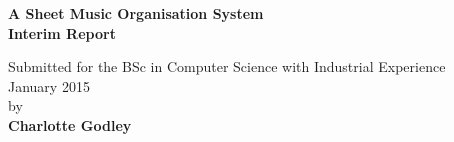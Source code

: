 \begin{titlepage}
    \begin{center}
        \vspace*{1cm}
        \Huge
        \textbf{A Sheet Music Organisation System\\\Large Interim Report}
        
        \vspace{0.5cm}
        \normalsize
        Submitted for the BSc in Computer Science with Industrial Experience\\
        \vspace{0.5cm}
        January 2015\\
        \vspace{1.5cm}
        by\\
        \vspace{0.5cm}
        \large
        \textbf{Charlotte Godley}
        \normalsize
        \vfill
        
    \end{center}
\end{titlepage}